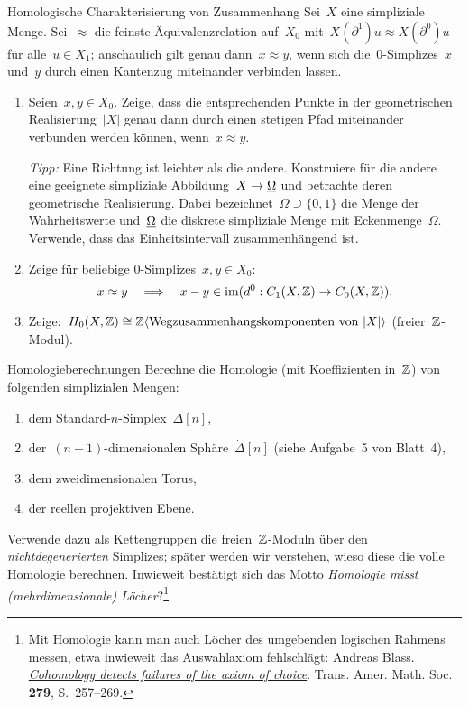 \documentclass{uebblatt}
\begin{document}

\begin{aufgabe}{Homologische Charakterisierung von Zusammenhang}
Sei~$X$ eine simpliziale Menge. Sei~$\approx$ die feinste Äquivalenzrelation
auf~$X_0$ mit~$X(\partial^1)u \approx X(\partial^0)u$ für alle~$u \in X_1$;
anschaulich gilt genau dann~$x \approx y$, wenn sich die~0-Simplizes~$x$
und~$y$ durch einen Kantenzug miteinander verbinden lassen.
\begin{enumerate}
\item Seien~$x,y \in X_0$. Zeige, dass die entsprechenden Punkte in der
geometrischen Realisierung~$|X|$ genau dann durch einen stetigen Pfad
miteinander verbunden werden können, wenn~$x \approx y$.

\emph{Tipp:} Eine Richtung ist leichter als die andere. Konstruiere für die
andere eine geeignete simpliziale Abbildung~$X \to \underline{\Omega}$ und betrachte
deren geometrische Realisierung. Dabei bezeichnet~$\Omega \supseteq \{0,1\}$ die
Menge der Wahrheitswerte und~$\underline{\Omega}$ die diskrete simpliziale Menge mit
Eckenmenge~$\Omega$. Verwende, dass das Einheitsintervall zusammenhängend ist.

\item Zeige für beliebige 0-Simplizes~$x,y \in X_0$:
\[ x \approx y
  \quad\Longrightarrow\quad
  x - y \in \operatorname{im}(d^0 : C_1(X,\mathbb{Z}) \to C_0(X,\mathbb{Z})). \]

\item Zeige:~$H_0(X,\mathbb{Z}) \cong \mathbb{Z}\langle \text{Wegzusammenhangskomponenten
von~$|X|$} \rangle$ (freier~$\mathbb{Z}$-Modul).
\end{enumerate}
\end{aufgabe}

\begin{aufgabe}{Homologieberechnungen}
Berechne die Homologie (mit Koeffizienten in~$\mathbb{Z}$) von folgenden simplizialen
Mengen:
\begin{enumerate}
\item dem Standard-$n$-Simplex~$\Delta[n]$,
\item der~$(n-1)$-dimensionalen Sphäre~$\dot\Delta[n]$ (siehe Aufgabe~5 von Blatt~4),
\item dem zweidimensionalen Torus,
\item der reellen projektiven Ebene.
\end{enumerate}
Verwende dazu als Kettengruppen die freien~$\mathbb{Z}$-Moduln über den
\emph{nichtdegenerierten} Simplizes; später werden wir verstehen, wieso diese
die volle Homologie berechnen. Inwieweit bestätigt sich das Motto \emph{Homologie misst
(mehrdimensionale) Löcher}?\footnote{Mit Homologie kann man auch Löcher des
umgebenden logischen Rahmens messen, etwa inwieweit das Auswahlaxiom
fehlschlägt: Andreas Blass.
\emph{\href{http://www.ams.org/journals/tran/1983-279-01/S0002-9947-1983-0704615-7/S0002-9947-1983-0704615-7.pdf}{Cohomology detects failures of the axiom of
choice}}. Trans. Amer. Math. Soc. \textbf{279}, S.~257--269.}
\end{aufgabe}
\end{document}
